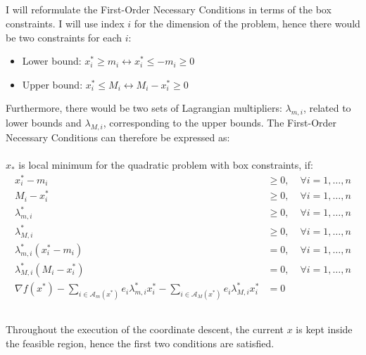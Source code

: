 \documentclass[a4paper]{article}
\begin{document}
\subsection{}
I will reformulate the First-Order Necessary Conditions in terms of the box
constraints. I will use index $i$ for the dimension of the problem, hence there
would be two constraints for each $i$:
\begin{itemize}
\item Lower bound: $x_i^* \geq m_i \leftrightarrow x_i^* \leq - m_i \geq 0 $
\item Upper bound: $x_i^* \leq M_i \leftrightarrow M_i - x_i^*\geq 0 $
\end{itemize}
Furthermore, there would be two sets of Lagrangian multipliers: $\lambda_{m,i}$,
related to lower bounds and $\lambda_{M,i}$, corresponding to
the upper bounds. The First-Order Necessary Conditions can therefore be
expressed as: \\\\
$x_*$ is local minimum for the quadratic problem with box constraints, if:
\begin{align}
  x_i^* - m_i &\geq 0 ,\; & \forall i=1, \ldots, n \\
  M_i - x_i^* &\geq 0 ,\; & \forall i=1, \ldots, n \\
  \lambda_{m,i}^{*} &\geq 0 ,\; & \forall i=1, \ldots, n \\
  \lambda_{M,i}^{*} &\geq 0 ,\; & \forall i=1, \ldots, n \\
  \lambda_{m,i}^{*}(x_i^* - m_i)& =0, \; & \forall i=1, \ldots, n\\
  \lambda_{M,i}^{*}( M_i - x_i^*) &=0, \; & \forall i=1, \ldots, n\\
  \nabla f\left(x^{*}\right)
  -
  \sum_{i \in \mathcal{A}_m\left(x^{*}\right)} e_i\lambda_{m,i}^{*} x^{*}_i
  -
  \sum_{i \in \mathcal{A}_M\left(x^{*}\right)} e_i \lambda_{M,i}^{*} x^{*}_i &= 0
\end{align}

\subsection{}

\subsection{}

\subsection{}
Throughout the execution of the coordinate descent, the current $x$ is kept
inside the feasible region, hence the first two conditions are satisfied.
\end{document}

